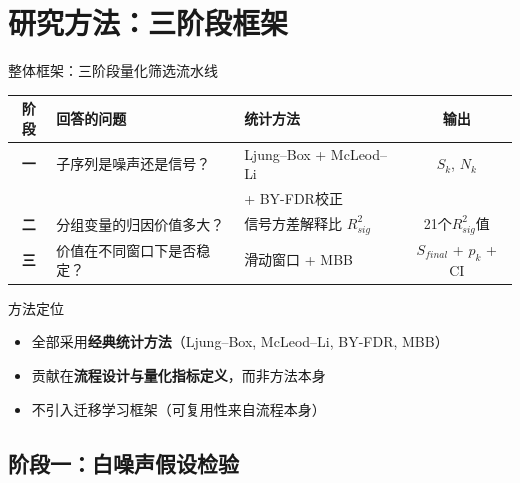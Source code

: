 \documentclass{beamer}
\begin{document}
\section{研究方法：三阶段框架}

\begin{frame}{整体框架：三阶段量化筛选流水线}
    \begin{table}
        \centering
        \begin{tabular}{cllc}
            \toprule
            阶段 & 回答的问题 & 统计方法 & 输出 \\
            \midrule
            \textbf{一} & 子序列是噪声还是信号？ & Ljung--Box + McLeod--Li & $S_k$, $N_k$ \\
            && + BY-FDR校正 & \\
            \textbf{二} & 分组变量的归因价值多大？ & 信号方差解释比 $R^2_{sig}$ & 21个$R^2_{sig}$值 \\
            \textbf{三} & 价值在不同窗口下是否稳定？ & 滑动窗口 + MBB & $S_{final}$ + $p_k$ + CI \\
            \bottomrule
        \end{tabular}
    \end{table}
    
    \begin{block}{方法定位}
        \begin{itemize}
            \item 全部采用\textbf{经典统计方法}（Ljung--Box, McLeod--Li, BY-FDR, MBB）
            \item 贡献在\textbf{流程设计与量化指标定义}，而非方法本身
            \item 不引入迁移学习框架（可复用性来自流程本身）
        \end{itemize}
    \end{block}
\end{frame}

\subsection{阶段一：白噪声假设检验}
\end{document}
